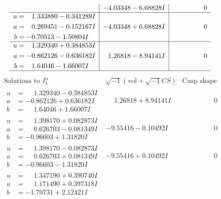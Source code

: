 \documentclass[1p]{elsarticle_modified}
\theoremstyle{definition}
\newcommand{\I}{\sqrt{-1}}
\begin{document}
$$\begin{array}{c|c|c}
 & -4.03348 - 6.68828 I & \phantom{-0.000000 } 0 \\ \hline\begin{aligned}
u &= \phantom{-}1.333880 - 0.341289 I \\
a &= \phantom{-}0.269451 - 0.152167 I \\
b &= -0.70513 - 1.50804 I\end{aligned}
 & -4.03348 + 6.68828 I & \phantom{-0.000000 } 0 \\ \hline\begin{aligned}
u &= \phantom{-}1.329340 + 0.384853 I \\
a &= -0.862126 - 0.636182 I \\
b &= \phantom{-}1.64046 - 1.66007 I\end{aligned}
 & \phantom{-}1.26818 - 8.94141 I & \phantom{-0.000000 } 0\\
 \hline 
 \end{array}$$\newpage$$\begin{array}{c|c|c}  
\text{Solutions to }I^u_{1}& \I (\text{vol} + \sqrt{-1}CS) & \text{Cusp shape}\\
 \hline 
\begin{aligned}
u &= \phantom{-}1.329340 - 0.384853 I \\
a &= -0.862126 + 0.636182 I \\
b &= \phantom{-}1.64046 + 1.66007 I\end{aligned}
 & \phantom{-}1.26818 + 8.94141 I & \phantom{-0.000000 } 0 \\ \hline\begin{aligned}
u &= \phantom{-}1.398170 + 0.082873 I \\
a &= \phantom{-}0.626703 - 0.081349 I \\
b &= -0.96603 + 1.31820 I\end{aligned}
 & -9.55416 - 0.10492 I & \phantom{-0.000000 } 0 \\ \hline\begin{aligned}
u &= \phantom{-}1.398170 - 0.082873 I \\
a &= \phantom{-}0.626703 + 0.081349 I \\
b &= -0.96603 - 1.31820 I\end{aligned}
 & -9.55416 + 0.10492 I & \phantom{-0.000000 } 0 \\ \hline\begin{aligned}
u &= \phantom{-}1.347190 + 0.390740 I \\
a &= \phantom{-}1.171490 + 0.397318 I \\
b &= -1.70731 + 2.12421 I\end{aligned}

\end{array}$$
\end{document}

